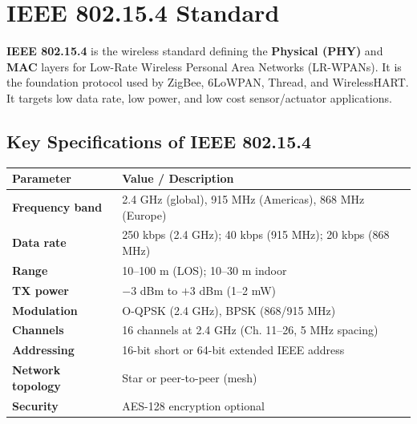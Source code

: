\documentclass[12pt,a4paper]{article}
\renewcommand{\arraystretch}{1.45}
\begin{document}
\section{IEEE 802.15.4 Standard}

\begin{tcolorbox}[defbox, title={\textbf{IEEE 802.15.4 --- Definition}}]
\textbf{IEEE 802.15.4} is the wireless standard defining the \textbf{Physical (PHY)} and \textbf{MAC} layers for Low-Rate Wireless Personal Area Networks (LR-WPANs). It is the foundation protocol used by ZigBee, 6LoWPAN, Thread, and WirelessHART. It targets low data rate, low power, and low cost sensor/actuator applications.
\end{tcolorbox}

\subsection{Key Specifications of IEEE 802.15.4}

\par\noindent
{\renewcommand{\arraystretch}{1.5}%
\begin{tabularx}{\linewidth}{|B{3.4cm}|Y|}
\hline
\textbf{Parameter} & \textbf{Value / Description} \\
\hline
\textbf{Frequency band} & 2.4 GHz (global), 915 MHz (Americas), 868 MHz (Europe) \\
\hline
\textbf{Data rate} & 250 kbps (2.4 GHz); 40 kbps (915 MHz); 20 kbps (868 MHz) \\
\hline
\textbf{Range} & 10--100 m (LOS); 10--30 m indoor \\
\hline
\textbf{TX power} & $-3$ dBm to $+3$ dBm (1--2 mW) \\
\hline
\textbf{Modulation} & O-QPSK (2.4 GHz), BPSK (868/915 MHz) \\
\hline
\textbf{Channels} & 16 channels at 2.4 GHz (Ch. 11--26, 5 MHz spacing) \\
\hline
\textbf{Addressing} & 16-bit short or 64-bit extended IEEE address \\
\hline
\textbf{Network topology} & Star or peer-to-peer (mesh) \\
\hline
\textbf{Security} & AES-128 encryption optional \\
\hline
\end{tabularx}}
\end{document}
